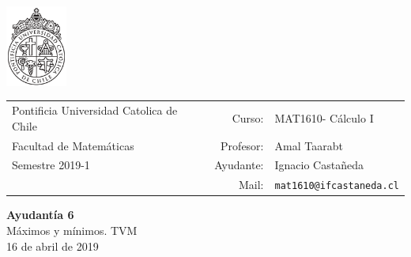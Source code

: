 \documentclass[12pt]{article}
\makeatletter
\newcommand{\ayudantia}{{\sc Ayudantía 6}}
\newcommand{\tituloayu}{Máximos y mínimos. TVM}
\newcommand{\fecha}{16 de abril de 2019}
\newcommand{\sigla}{MAT1610}
\newcommand{\nombre}{Cálculo I}
\newcommand{\profesor}{Amal Taarabt}
\newcommand{\ano}{2019}
\newcommand{\semestre}{1}
\newcommand{\mail}{mat1610@ifcastaneda.cl}
\makeatother
\begin{document}
\thispagestyle{empty}

\begin{minipage}{2cm}
	\includegraphics[width=2cm]{../../../../img/logo.pdf}
	\vspace{0.5cm}
\end{minipage}
\begin{minipage}{\linewidth}
	\begin{tabular}{lrl}
		{\scriptsize\sc Pontificia Universidad Catolica de Chile} & \hspace*{0.7in}Curso: &
		\sigla  - \nombre\\
		{\sc Facultad de Matemáticas}&
		Profesor: & \profesor \\
		{\sc Semestre \ano-\semestre} & Ayudante: & {Ignacio Castañeda}\\
		& {Mail:} & \texttt{\mail}
	\end{tabular}
\end{minipage}

\vspace{-10mm}
\begin{center}
	{\LARGE\bf \ayudantia}\\
	\vspace{0.1cm}
	{\tituloayu}\\
	\vspace{0.1cm}
	\fecha\\
	\vspace{0.4cm}
\end{center}
\end{document}
